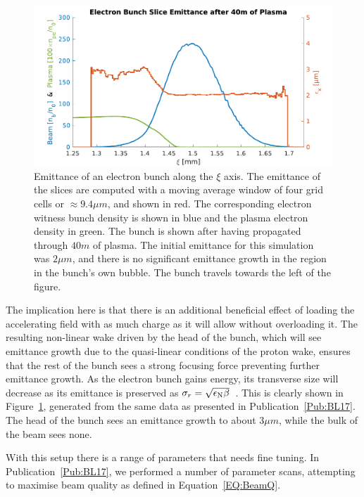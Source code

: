 \begin{figure}[hbt]
    \centering
    \includegraphics[width=0.8125\linewidth]{figures/40mSliceEmittance}
    \caption{\label{Fig:SimA:BL17Emitt}
        Emittance of an electron bunch along the $\xi$ axis.
        The emittance of the slices are computed with a moving average window of four grid cells or $\approx 9.4\unit{\mu m}$, and shown in red.
        The corresponding electron witness bunch density is shown in blue and the plasma electron density in green.
        The bunch is shown after having propagated through $40\unit{m}$ of plasma.
        The initial emittance for this simulation was $2\unit{\mu m}$, and there is no significant emittance growth in the region in the bunch's own bubble.
        The bunch travels towards the left of the figure.
    }
\end{figure}

The implication here is that there is an additional beneficial effect of loading the accelerating field with as much charge as it will allow without overloading it.
The resulting non-linear wake driven by the head of the bunch, which will see emittance growth due to the quasi-linear conditions of the proton wake, ensures that the rest of the bunch sees a strong focusing force preventing further emittance growth.
As the electron bunch gains energy, its transverse size will decrease as its emittance is preserved as $\sigma_{r} = \sqrt{\epsilon_{\mathrm{N}}\beta}$~\cite{wille:2001}.
This is clearly shown in Figure~\ref{Fig:SimA:BL17Emitt}, generated from the same data as presented in Publication~\ref{Pub:BL17}.
The head of the bunch sees an emittance growth to about $3\unit{\mu m}$, while the bulk of the beam sees none.

With this setup there is a range of parameters that needs fine tuning.
In Publication~\ref{Pub:BL17}, we performed a number of parameter scans, attempting to maximise beam quality as defined in Equation~\ref{EQ:BeamQ}.

